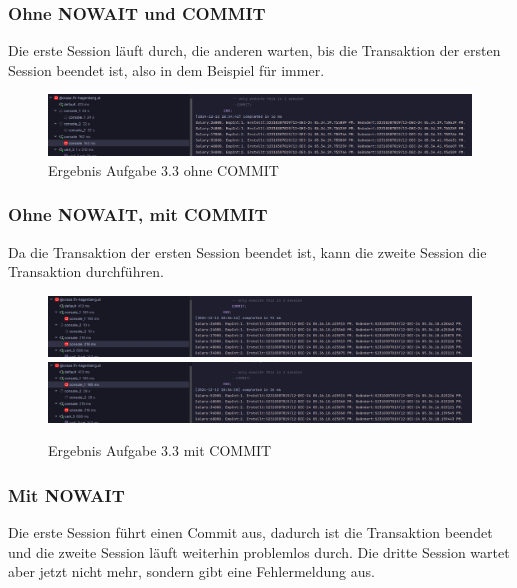\documentclass[12pt]{scrartcl}
\begin{document}
\subsubsection{Ohne NOWAIT und COMMIT}

Die erste Session läuft durch, die anderen warten, bis die Transaktion der ersten Session beendet ist, also in dem Beispiel für immer.

\begin{figure}[h]
	\centering
	\includegraphics[width=1\textwidth]{../ue4_3_session1_1.png}
	\caption{Ergebnis Aufgabe 3.3 ohne COMMIT}
\end{figure}

\subsubsection{Ohne NOWAIT, mit COMMIT}

Da die Transaktion der ersten Session beendet ist, kann die zweite Session die Transaktion durchführen.

\begin{figure}[h]
	\centering
	\includegraphics[width=1\textwidth]{../ue4_3_session1_2.png}
	\includegraphics[width=1\textwidth]{../ue4_3_session2_1.png}
	\caption{Ergebnis Aufgabe 3.3 mit COMMIT}
\end{figure}

\pagebreak

\subsubsection{Mit NOWAIT}

Die erste Session führt einen Commit aus, dadurch ist die Transaktion beendet und die zweite Session läuft weiterhin problemlos durch.
Die dritte Session wartet aber jetzt nicht mehr, sondern gibt eine Fehlermeldung aus.
\end{document}
